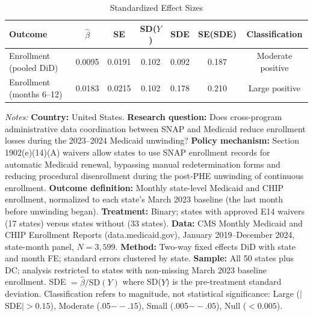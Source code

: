 \begin{table}[t]
\centering
\caption{Standardized Effect Sizes}
\label{tab:sde}
\small
\begin{tabular}{lcccccc}
\toprule
Outcome & $\hat{\beta}$ & SE & SD($Y$) & SDE & SE(SDE) & Classification \\
\midrule
Enrollment (pooled DiD) & 0.0095 & 0.0191 & 0.102 & 0.092 & 0.187 & Moderate positive \\
Enrollment (months 6--12) & 0.0183 & 0.0215 & 0.102 & 0.178 & 0.210 & Large positive \\
\bottomrule
\end{tabular}
\begin{tablenotes}
\item \textit{Notes:} \textbf{Country:} United States. \textbf{Research question:} Does cross-program administrative data coordination between SNAP and Medicaid reduce enrollment losses during the 2023--2024 Medicaid unwinding? \textbf{Policy mechanism:} Section 1902(e)(14)(A) waivers allow states to use SNAP enrollment records for automatic Medicaid renewal, bypassing manual redetermination forms and reducing procedural disenrollment during the post-PHE unwinding of continuous enrollment. \textbf{Outcome definition:} Monthly state-level Medicaid and CHIP enrollment, normalized to each state's March 2023 baseline (the last month before unwinding began). \textbf{Treatment:} Binary; states with approved E14 waivers (17 states) versus states without (33 states). \textbf{Data:} CMS Monthly Medicaid and CHIP Enrollment Reports (data.medicaid.gov), January 2019--December 2024, state-month panel, $N = 3{,}599$. \textbf{Method:} Two-way fixed effects DiD with state and month FE; standard errors clustered by state. \textbf{Sample:} All 50 states plus DC; analysis restricted to states with non-missing March 2023 baseline enrollment. SDE $= \hat{\beta} / \text{SD}(Y)$ where SD($Y$) is the pre-treatment standard deviation. Classification refers to magnitude, not statistical significance: Large ($|$SDE$| > 0.15$), Moderate (.05$--.15$), Small (.005$--.05$), Null ($< 0.005$).
\end{tablenotes}
\end{table}

